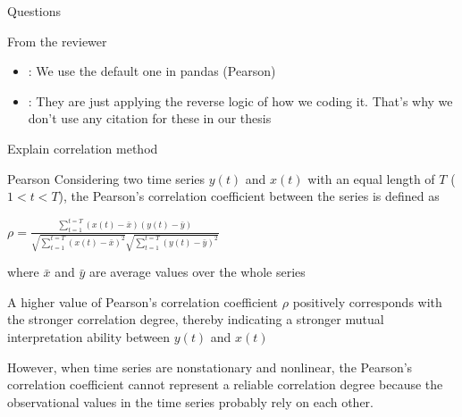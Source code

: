 \documentclass[compress, mathserif, fleqn, 10pt]{beamer}
\begin{document}
	\begin{frame}{Questions}
		\begin{block}{From the reviewer}
			\begin{itemize}
				\item {}: We use the default one in pandas (Pearson)
				
				\item {}: They
				are just applying the reverse logic of how we coding it. That's why we
				don't use any citation for these in our thesis
			\end{itemize}
		\end{block}
	\end{frame}
	
	\begin{frame}{Explain correlation method}
		\begin{block}{Pearson}
			Considering two time series $y(t)$ and $x(t)$ with an equal length of $T$ ($1
			< t < T$), the Pearson's correlation coefficient between the series is
			defined as
			
			\bigskip
			
			\centerline{$\rho=\frac{\sum_{t=1}^{t=T}(x(t)-\bar{x})(y(t)-\bar{y})}{\sqrt{\sum_{t=1}^{t=T}(x(t)-\bar{x})^{2}} \sqrt{\sum_{t=1}^{t=T}(y(t)-\bar{y})^{2}}}$}
			\bigskip
			where $\bar{x}$ and $\bar{y}$ are average values over the whole series
			
			\smallskip
			
			A higher value of Pearson’s correlation coefficient $\rho$ positively corresponds
			with the stronger correlation degree, thereby indicating a stronger mutual
			interpretation ability between $y(t)$ and $x(t)$
		\end{block}
		
		\begin{exampleblock}{}
			However, when time series are nonstationary and nonlinear, the Pearson's correlation
			coefficient cannot represent a reliable correlation degree because the observational
			values in the time series probably rely on each other.
		\end{exampleblock}
	\end{frame}
	
\end{document}
